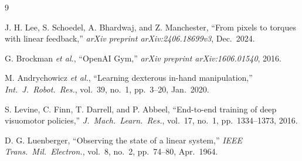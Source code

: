 \documentclass[conference]{IEEEtran}
\begin{document}
\begin{thebibliography}{9}

J. H. Lee, S. Schoedel, A. Bhardwaj, and Z. Manchester,
``From pixels to torques with linear feedback,''
\emph{arXiv preprint arXiv:2406.18699v3}, Dec.\ 2024.

G. Brockman \emph{et al.},
``OpenAI Gym,''
\emph{arXiv preprint arXiv:1606.01540}, 2016.

M. Andrychowicz \emph{et al.},
``Learning dexterous in-hand manipulation,''
\emph{Int.\ J.\ Robot.\ Res.}, vol.~39, no.~1, pp.~3--20, Jan.\ 2020.

S. Levine, C. Finn, T. Darrell, and P. Abbeel,
``End-to-end training of deep visuomotor policies,''
\emph{J.\ Mach.\ Learn.\ Res.}, vol.~17, no.~1, pp.~1334--1373, 2016.

D. G. Luenberger,
``Observing the state of a linear system,''
\emph{IEEE Trans.\ Mil.\ Electron.}, vol.~8, no.~2, pp.~74--80, Apr.\ 1964.

\end{thebibliography}
\end{document}
